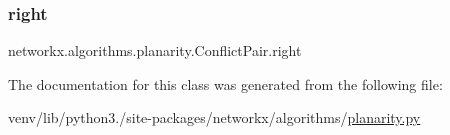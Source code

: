\subsubsection{\texorpdfstring{right}{right}}
{\footnotesize\ttfamily networkx.\+algorithms.\+planarity.\+Conflict\+Pair.\+right}



The documentation for this class was generated from the following file\+:\begin{DoxyCompactItemize}
\item 
venv/lib/python3./site-\/packages/networkx/algorithms/\hyperlink{planarity_8py}{planarity.\+py}\end{DoxyCompactItemize}
